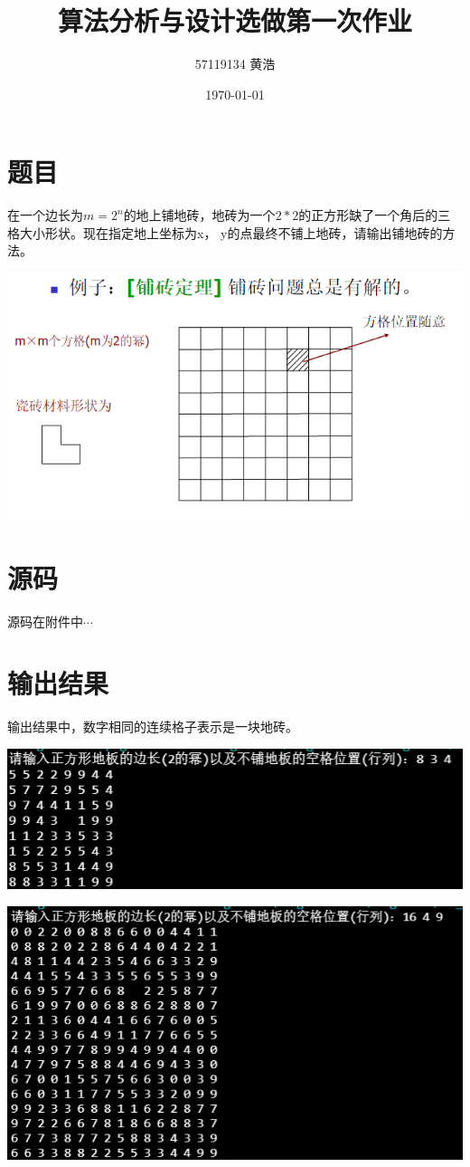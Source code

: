 \documentclass[UTF8]{ctexart}
\title{算法分析与设计选做第一次作业}
\author{57119134 黄浩}
\date{\today}
\begin{document}
\maketitle
\section{题目}

在一个边长为$m = 2^n$的地上铺地砖，地砖为一个$2 * 2$的正方形缺了一个角后的三格大小形状。现在指定地上坐标为x， y的点最终不铺上地砖，请输出铺地砖的方法。

\includegraphics[width = 1\textwidth]{3.png}

\section{源码}

源码在附件中$\cdots$

\section{输出结果}

输出结果中，数字相同的连续格子表示是一块地砖。

\includegraphics[width = 1\textwidth]{2.png}

\includegraphics[width = 1\textwidth]{1.png}
\end{document}
